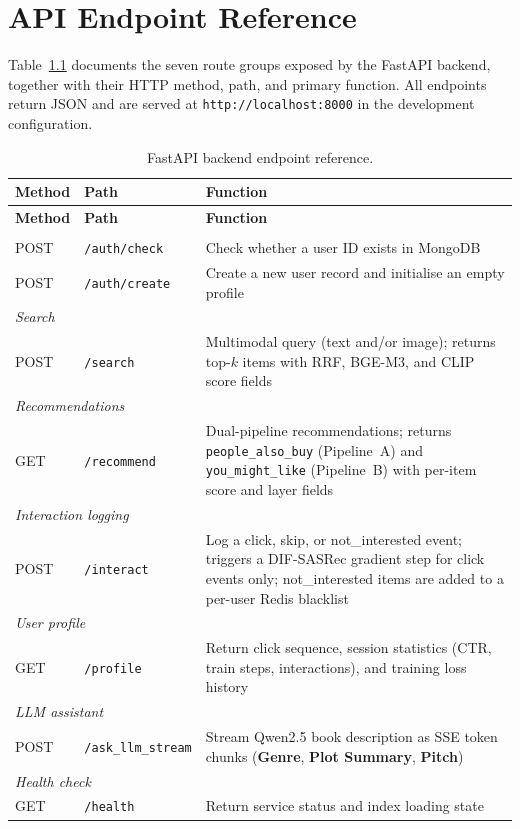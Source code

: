 \appendix
\chapter{API Endpoint Reference}
\label{app:api}

Table~\ref{tab:api_endpoints} documents the seven route groups exposed by the FastAPI backend, together with their HTTP method, path, and primary function.
All endpoints return JSON and are served at \texttt{http://localhost:8000} in the development configuration.

\begin{longtable}{p{1.6cm} p{4.8cm} p{6.6cm}}
\caption{FastAPI backend endpoint reference.}
\label{tab:api_endpoints} \\
\hline
\textbf{Method} & \textbf{Path} & \textbf{Function} \\
\hline
\endfirsthead
\hline
\textbf{Method} & \textbf{Path} & \textbf{Function} \\
\hline
\endhead
\hline
\endfoot
\hline
\endlastfoot
\multicolumn{3}{l}{\textit{Authentication}} \\
POST & \texttt{/auth/check}       & Check whether a user ID exists in MongoDB \\
POST & \texttt{/auth/create}      & Create a new user record and initialise an empty profile \\
\hline
\multicolumn{3}{l}{\textit{Search}} \\
POST & \texttt{/search}           & Multimodal query (text and/or image); returns top-$k$ items with RRF, BGE-M3, and CLIP score fields \\
\hline
\multicolumn{3}{l}{\textit{Recommendations}} \\
GET  & \texttt{/recommend}        & Dual-pipeline recommendations; returns \texttt{people\_also\_buy} (Pipeline~A) and \texttt{you\_might\_like} (Pipeline~B) with per-item score and layer fields \\
\hline
\multicolumn{3}{l}{\textit{Interaction logging}} \\
POST & \texttt{/interact}         & Log a click, skip, or not\_interested event; triggers a DIF-SASRec gradient step for click events only; not\_interested items are added to a per-user Redis blacklist \\
\hline
\multicolumn{3}{l}{\textit{User profile}} \\
GET  & \texttt{/profile}          & Return click sequence, session statistics (CTR, train steps, interactions), and training loss history \\
\hline
\multicolumn{3}{l}{\textit{LLM assistant}} \\
POST & \texttt{/ask\_llm\_stream} & Stream Qwen2.5 book description as SSE token chunks (\textbf{Genre}, \textbf{Plot Summary}, \textbf{Pitch}) \\
\hline
\multicolumn{3}{l}{\textit{Health check}} \\
GET  & \texttt{/health}           & Return service status and index loading state \\
\end{longtable}

